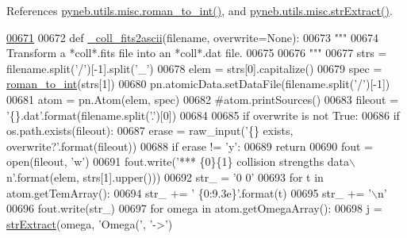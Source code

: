 References \hyperlink{misc_8py_source_l00095}{pyneb.\-utils.\-misc.\-roman\-\_\-to\-\_\-int()}, and \hyperlink{misc_8py_source_l00180}{pyneb.\-utils.\-misc.\-str\-Extract()}.


\begin{DoxyCode}
\hypertarget{namespacepyneb_1_1utils_1_1manage__atomic__data_l00671}{}\hyperlink{namespacepyneb_1_1utils_1_1manage__atomic__data_a1d70a5d8b876f114e058506cd9998de4}{00671} 
00672 \textcolor{keyword}{def }\hyperlink{namespacepyneb_1_1utils_1_1manage__atomic__data_a1d70a5d8b876f114e058506cd9998de4}{\_coll\_fits2ascii}(filename, overwrite=None):
00673     \textcolor{stringliteral}{"""}
00674 \textcolor{stringliteral}{    Transform a *coll*.fits file into an *coll*.dat file.}
00675 \textcolor{stringliteral}{    }
00676 \textcolor{stringliteral}{    """}
00677     strs = filename.split(\textcolor{stringliteral}{'/'})[-1].split(\textcolor{stringliteral}{'\_'})
00678     elem = strs[0].capitalize()
00679     spec = \hyperlink{namespacepyneb_1_1utils_1_1misc_ae67dbd6bb48d64216bc162ebdc25a183}{roman\_to\_int}(strs[1])
00680     pn.atomicData.setDataFile(filename.split(\textcolor{stringliteral}{'/'})[-1])
00681     atom = pn.Atom(elem, spec)
00682     \textcolor{comment}{#atom.printSources()}
00683     fileout = \textcolor{stringliteral}{'\{\}.dat'}.format(filename.split(\textcolor{stringliteral}{'.'})[0])
00684     
00685     \textcolor{keywordflow}{if} overwrite \textcolor{keywordflow}{is} \textcolor{keywordflow}{not} \textcolor{keyword}{True}:
00686         \textcolor{keywordflow}{if} os.path.exists(fileout):
00687             erase = raw\_input(\textcolor{stringliteral}{'\{\} exists, overwrite?'}.format(fileout))
00688             \textcolor{keywordflow}{if} erase != \textcolor{stringliteral}{'y'}:
00689                 \textcolor{keywordflow}{return}
00690     fout = open(fileout, \textcolor{stringliteral}{'w'})
00691     fout.write(\textcolor{stringliteral}{'*** \{0\}\{1\} collision strengths data\(\backslash\)n'}.format(elem, strs[1].upper()))
00692     str\_ = \textcolor{stringliteral}{'0 0'}
00693     \textcolor{keywordflow}{for} t \textcolor{keywordflow}{in} atom.getTemArray():
00694         str\_ += \textcolor{stringliteral}{' \{0:9.3e\}'}.format(t)
00695     str\_ += \textcolor{stringliteral}{'\(\backslash\)n'}
00696     fout.write(str\_)
00697     \textcolor{keywordflow}{for} omega \textcolor{keywordflow}{in} atom.getOmegaArray():
00698         j = \hyperlink{namespacepyneb_1_1utils_1_1misc_aaf9c5249e3c3104e38854ca30f9df4b7}{strExtract}(omega, \textcolor{stringliteral}{'Omega('}, \textcolor{stringliteral}{'->'})

\end{DoxyCode}
